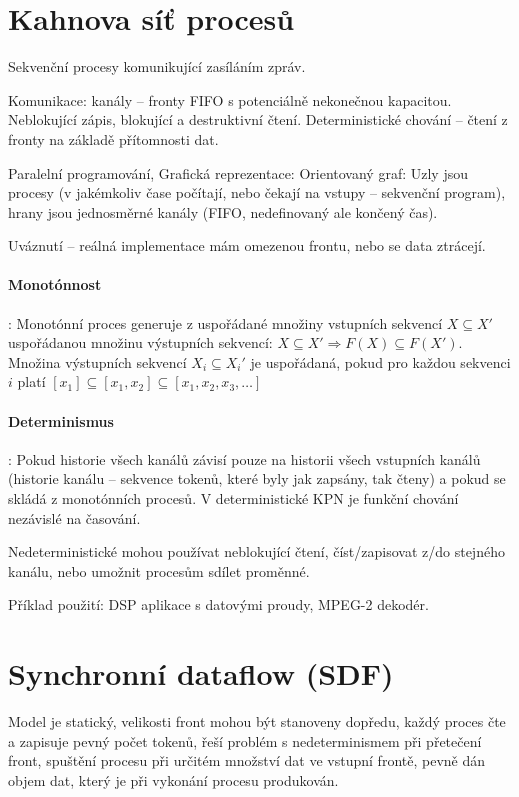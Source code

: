\documentclass[a4paper, 11pt]{report}
\begin{document}
\section{Kahnova síť procesů}
Sekvenční procesy komunikující zasíláním zpráv.

Komunikace: kanály -- fronty FIFO s potenciálně nekonečnou kapacitou. Neblokující zápis, blokující a destruktivní čtení. Deterministické chování -- čtení z fronty na základě přítomnosti dat.

Paralelní programování, Grafická reprezentace: Orientovaný graf: Uzly jsou procesy (v jakémkoliv čase počítají, nebo čekají na vstupy -- sekvenční program), hrany jsou jednosměrné kanály (FIFO, nedefinovaný ale končený čas).

Uváznutí -- reálná implementace mám omezenou frontu, nebo se data ztrácejí.

\paragraph{Monotónnost}: Monotónní proces generuje z uspořádané množiny vstupních sekvencí $X \subseteq{X'}$ uspořádanou množinu výstupních sekvencí: $X \subseteq X' \Rightarrow F(X) \subseteq F(X')$.
Množina výstupních sekvencí $X_i \subseteq X_i'$ je uspořádaná, pokud pro každou sekvenci $i$ platí
$[x_1] \subseteq [x_1, x_2] \subseteq [x_1, x_2, x_3, \dots]$

\paragraph{Determinismus}: Pokud historie všech kanálů závisí pouze na historii všech vstupních kanálů (historie kanálu -- sekvence tokenů, které byly jak zapsány, tak čteny) a pokud se skládá z monotónních procesů.
V deterministické KPN je funkční chování nezávislé na časování.

Nedeterministické mohou používat neblokující čtení, číst/zapisovat z/do stejného kanálu, nebo umožnit procesům sdílet proměnné.

Příklad použití: DSP aplikace s datovými proudy, MPEG-2 dekodér.

\section{Synchronní dataflow (SDF)}

Model je statický, velikosti front mohou být stanoveny dopředu, každý proces čte a zapisuje pevný počet tokenů, řeší problém s nedeterminismem při přetečení front, spuštění procesu při určitém množství dat ve vstupní frontě, pevně dán objem dat, který je při vykonání procesu produkován.
\end{document}
